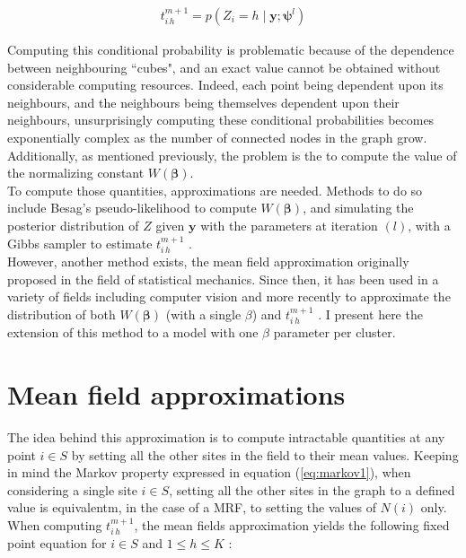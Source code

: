 \begin{align*}
t_{i\,h}^{m+1} = p(Z_i = h \mid \boldsymbol{y};\boldsymbol{\psi}^{l})
\end{align*}

Computing this conditional probability is problematic because of the dependence between neighbouring ``cubes", and an exact value cannot be obtained without considerable computing resources. Indeed, each point being dependent upon its neighbours, and the neighbours being themselves dependent upon their neighbours, unsurprisingly computing these conditional probabilities becomes exponentially complex as the number of connected nodes in the graph grow. Additionally, as mentioned previously, the problem is the to compute the value of the normalizing constant $W(\boldsymbol{\beta})$.\\

To compute those quantities, approximations are needed. Methods to do so include Besag's pseudo-likelihood \cite{Besag75} to compute $W(\boldsymbol{\beta})$, and simulating the posterior distribution of $Z$ given $\boldsymbol{y}$ with the parameters at iteration $(l)$, with a Gibbs sampler to estimate $t_{i\,h}^{m+1}$ \cite{Chalmond89}.\\

However, another method exists, the mean field approximation originally proposed in the field of statistical mechanics. Since then, it has been used in a variety of fields including computer vision \cite{Yuille90} and more recently to approximate the distribution of both $W(\boldsymbol{\beta})$ (with a single $\beta$) and $t_{i\,h}^{m+1}$ \cite{Zhang92}. I present here the extension of this method to a model with one $\beta$ parameter per cluster.

\section{Mean field approximations}

The idea behind this approximation is to compute intractable quantities at any point $i \in S$ by setting all the other sites in the field to their mean values. Keeping in mind the Markov property expressed in equation (\ref{eq:markov1}), when considering a single site $i \in S$, setting all the other sites in the graph to a defined value is equivalentm, in the case of a MRF, to setting the values of $N(i)$ only.\\

When computing $t_{i\,h}^{m+1}$, the mean fields approximation yields the following fixed point equation for $i \in S$ and $1 \leq h \leq K$ \cite{Dang98}:

